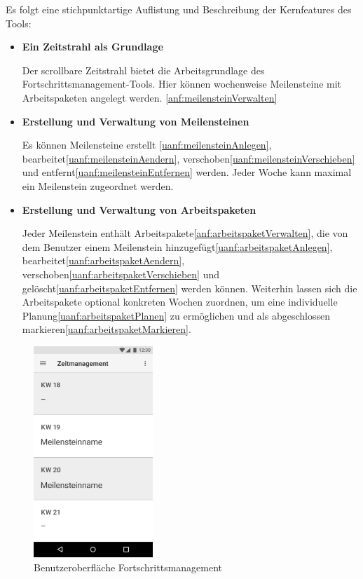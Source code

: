 \documentclass{scrreprt}
\begin{document}
\par\bigskip Es folgt eine stichpunktartige Auflistung und Beschreibung der Kernfeatures des Tools:
\begin{itemize}
\item \textbf{Ein Zeitstrahl als Grundlage}
\par Der scrollbare Zeitstrahl bietet die Arbeitsgrundlage des Fortschrittsmanagement-Tools. Hier können wochenweise Meilensteine mit Arbeitspaketen angelegt werden.  \ref{anf:meilensteinVerwalten}
\item \textbf{Erstellung und Verwaltung von Meilensteinen}
\par Es können Meilensteine erstellt \ref{uanf:meilensteinAnlegen}, bearbeitet\ref{uanf:meilensteinAendern}, verschoben\ref{uanf:meilensteinVerschieben} und entfernt\ref{uanf:meilensteinEntfernen} werden. Jeder Woche kann maximal ein Meilenstein zugeordnet werden.
\item \textbf{Erstellung und Verwaltung von Arbeitspaketen}
\par Jeder Meilenstein enthält Arbeitspakete\ref{anf:arbeitspaketVerwalten}, die von dem Benutzer einem Meilenstein hinzugefügt\ref{uanf:arbeitspaketAnlegen}, bearbeitet\ref{uanf:arbeitspaketAendern}, verschoben\ref{uanf:arbeitspaketVerschieben} und gelöscht\ref{uanf:arbeitspaketEntfernen} werden können. Weiterhin lassen sich die Arbeitspakete optional konkreten Wochen zuordnen, um eine individuelle Planung\ref{uanf:arbeitspaketPlanen} zu ermöglichen und als abgeschlossen markieren\ref{uanf:arbeitspaketMarkieren}.
\end{itemize}

\begin{figure}[H]
	\centering
	\includegraphics[width=0.4\textwidth, keepaspectratio]{Bilder/Prototyp/Zeitmanagement.png}
	\caption{Benutzeroberfläche Fortschrittsmanagement}
	\label{img:fortschrittsmanagement}
\end{figure}
\end{document}
